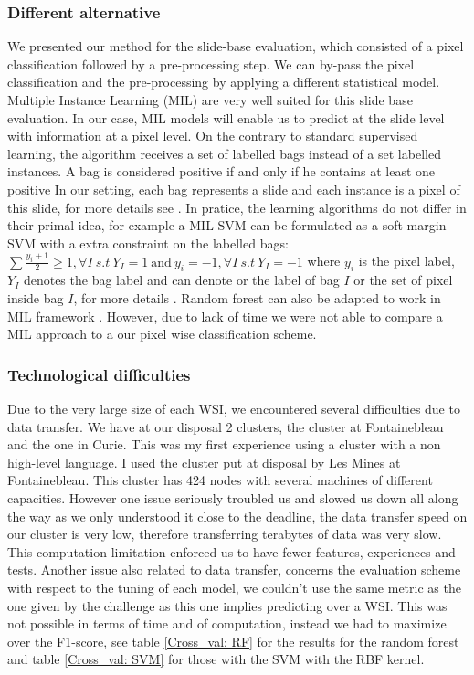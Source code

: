 \documentclass[a4paper,10pt]{article}
\begin{document}
\subsubsection*{Different alternative}

We presented our method for the slide-base evaluation, which consisted of a pixel classification followed by a pre-processing step. We can by-pass the pixel classification and the pre-processing by applying a different statistical model. Multiple Instance Learning (MIL) are very well suited for this slide base evaluation. 
In our case, MIL models will enable us to predict at the slide level with information at a pixel level. On the contrary to standard supervised learning, the algorithm receives a set of labelled bags instead of a set labelled instances. A bag is considered positive if and only if he contains at least one positive In our setting, each bag represents a slide and each instance is a pixel of this slide, for more details see \citep{maron1998multiple}. In pratice, the learning algorithms do not differ in their primal idea, for example a MIL SVM can be formulated as a soft-margin SVM with a extra constraint on the labelled bags: $\sum \frac{y_i+1}{2} \geqslant 1, \forall I \ s.t \ Y_I=1 \ \text{and} \ y_i=-1, \forall I \ s.t \ Y_I=-1$ where $y_i$ is the pixel label, $Y_I$ denotes the bag label and can denote or the label of bag $I$ or the set of pixel inside bag $I$, for more details \citep{andrews2002support}. Random forest can also be adapted to work in MIL framework \citep{leistner2010miforests}. However, due to lack of time we were not able to compare a MIL approach to a our pixel wise classification scheme.



\subsubsection*{Technological difficulties}

Due to the very large size of each WSI, we encountered several difficulties due to data transfer. We have at our disposal 2 clusters, the cluster at Fontainebleau and the one in Curie. This was my first experience using a cluster with a non high-level language. I used the cluster put at disposal by Les Mines at Fontainebleau. This cluster has 424 nodes with several machines of different capacities. However one issue seriously troubled us and slowed us down all along the way as we only understood it close to the deadline, the data transfer speed on our cluster is very low, therefore transferring terabytes of data was very slow. This computation limitation enforced us to have fewer features, experiences and tests. Another issue also related to data transfer, concerns the evaluation scheme with respect to the tuning of each model, we couldn't use the same metric as the one given by the challenge as this one implies predicting over a WSI. This was not possible in terms of time and of computation, instead we had to maximize over the F1-score, see table \ref{Cross_val: RF} for the results for the random forest and table \ref{Cross_val: SVM} for those with the SVM with the RBF kernel.
\end{document}
